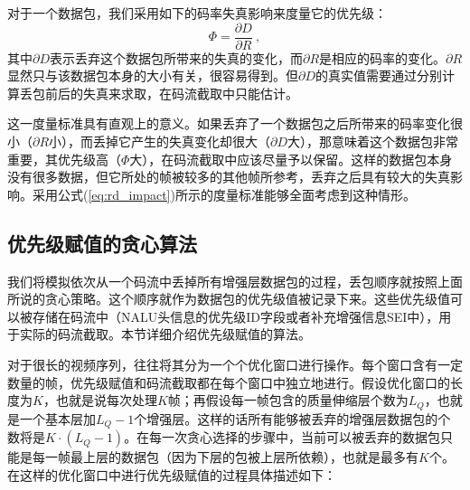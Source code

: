 对于一个数据包，我们采用如下的码率失真影响来度量它的优先级：
\begin{equation}
\label{eq:rd_impact}
\Phi = \dfrac{\partial D}{\partial R} \: ,
\end{equation}
其中$\partial D$表示丢弃这个数据包所带来的失真的变化，而$\partial R$是相应的码率的变化。$\partial R$显然只与该数据包本身的大小有关，很容易得到。但$\partial D$的真实值需要通过分别计算丢包前后的失真来求取，在码流截取中只能估计。

这一度量标准具有直观上的意义。如果丢弃了一个数据包之后所带来的码率变化很小（$\partial R$小），而丢掉它产生的失真变化却很大（$\partial D$大），那意味着这个数据包非常重要，其优先级高（$\Phi$大），在码流截取中应该尽量予以保留。这样的数据包本身没有很多数据，但它所处的帧被较多的其他帧所参考，丢弃之后具有较大的失真影响。采用公式(\ref{eq:rd_impact})所示的度量标准能够全面考虑到这种情形。

\subsection{优先级赋值的贪心算法}
\label{subsec:priority-assign}

我们将模拟依次从一个码流中丢掉所有增强层数据包的过程，丢包顺序就按照上面所说的贪心策略。这个顺序就作为数据包的优先级值被记录下来。这些优先级值可以被存储在码流中（NALU头信息的优先级ID字段或者补充增强信息SEI中），用于实际的码流截取。本节详细介绍优先级赋值的算法。

对于很长的视频序列，往往将其分为一个个优化窗口进行操作。每个窗口含有一定数量的帧，优先级赋值和码流截取都在每个窗口中独立地进行。假设优化窗口的长度为$K$，也就是说每次处理$K$帧；再假设每一帧包含的质量伸缩层个数为$L_Q$，也就是一个基本层加$L_Q-1$个增强层。这样的话所有能够被丢弃的增强层数据包的个数将是$K \cdot (L_Q-1)$。在每一次贪心选择的步骤中，当前可以被丢弃的数据包只能是每一帧最上层的数据包（因为下层的包被上层所依赖），也就是最多有$K$个。在这样的优化窗口中进行优先级赋值的过程具体描述如下：

